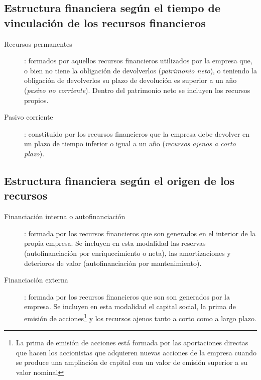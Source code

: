 \documentclass[10pt,a4paper,spanish]{report}
\begin{document}
            \subsection{\textcolor[rgb]{0.4,0.7,0.4}Estructura financiera según el tiempo de vinculación de los recursos financieros}

                  \begin{description}
                        \item[Recursos permanentes]: formados por aquellos recursos financieros utilizados por la empresa que, o bien no tiene la obligación de devolverlos (\textit{\textcolor[rgb]{0.4,0.7,0.4}{patrimonio neto}}), o teniendo la obligación de devolverlos su plazo de devolución es superior a un año (\textit{\textcolor[rgb]{0.4,0.7,0.4}{pasivo no corriente}}). Dentro del patrimonio neto se incluyen los recursos propios.
                        \item[Pasivo corriente]: constituido por los recursos financieros que la empresa debe devolver en un plazo de tiempo inferior o igual a un año (\textit{\textcolor[rgb]{0.4,0.7,0.4}{recursos ajenos a corto plazo}}).
                  \end{description}

            \subsection{\textcolor[rgb]{0.4,0.7,0.4}Estructura financiera según el origen de los recursos}

            	\begin{description}
            		\item[Financiación interna o autofinanciación]: formada por los recursos financieros que son generados en el interior de la propia empresa. Se incluyen en esta modalidad las reservas (autofinanciación por enriquecimiento o neta), las amortizaciones y deterioros de valor (autofinanciación por mantenimiento). 

            		\item[Financiación externa]: formada por los recursos financieros que son son generados por la empresa. Se incluyen en esta modalidad el capital social, la prima de emisión de acciones\footnote{La prima de emisión de acciones está formada por las aportaciones directas que hacen los accionistas que adquieren nuevas acciones de la empresa cuando se produce una ampliación de capital con un valor de emisión superior a su valor nominal} y los recursos ajenos tanto a corto como a largo plazo.
            	\end{description}
            	
\end{document}
